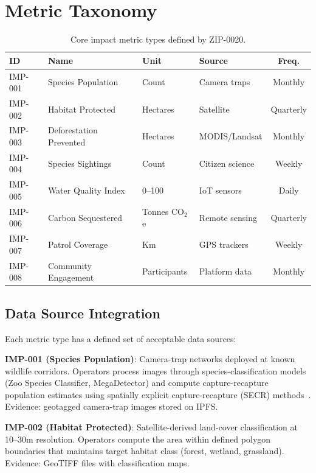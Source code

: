 \documentclass[11pt,letterpaper]{article}
\begin{document}
\section{Metric Taxonomy}
\label{sec:metrics}

\begin{table}[t]
\centering
\small
\begin{tabular}{llllc}
\toprule
\textbf{ID} & \textbf{Name} & \textbf{Unit} & \textbf{Source} & \textbf{Freq.} \\
\midrule
IMP-001 & Species Population & Count & Camera traps & Monthly \\
IMP-002 & Habitat Protected & Hectares & Satellite & Quarterly \\
IMP-003 & Deforestation Prevented & Hectares & MODIS/Landsat & Monthly \\
IMP-004 & Species Sightings & Count & Citizen science & Weekly \\
IMP-005 & Water Quality Index & 0--100 & IoT sensors & Daily \\
IMP-006 & Carbon Sequestered & Tonnes CO$_2$e & Remote sensing & Quarterly \\
IMP-007 & Patrol Coverage & Km & GPS trackers & Weekly \\
IMP-008 & Community Engagement & Participants & Platform data & Monthly \\
\bottomrule
\end{tabular}
\caption{Core impact metric types defined by ZIP-0020.}
\label{tab:metrics}
\end{table}

\subsection{Data Source Integration}

Each metric type has a defined set of acceptable data sources:

\textbf{IMP-001 (Species Population)}: Camera-trap networks deployed at known wildlife corridors. Operators process images through species-classification models (Zoo Species Classifier, MegaDetector) and compute capture-recapture population estimates using spatially explicit capture-recapture (SECR) methods~\cite{efford2009}. Evidence: geotagged camera-trap images stored on IPFS.

\textbf{IMP-002 (Habitat Protected)}: Satellite-derived land-cover classification at 10--30m resolution. Operators compute the area within defined polygon boundaries that maintains target habitat class (forest, wetland, grassland). Evidence: GeoTIFF files with classification maps.
\end{document}
